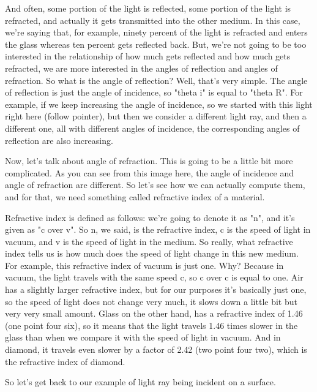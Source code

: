 And often, some portion of the light is reflected, some portion of the light is refracted, and actually it gets transmitted into the other medium. In this case, we're saying that, for example, ninety percent of the light is refracted and enters the glass whereas ten percent gets reflected back. But, we're not going to be too interested in the relationship of how much gets reflected and how much gets refracted, we are more interested in the angles of reflection and angles of refraction. So what is the angle of reflection? Well, that's very simple. The angle of reflection is just the angle of incidence, so "theta i" is equal to "theta R". For example, if we keep increasing the angle of incidence, so we started with this light right here (follow pointer), but then we consider a different light ray, and then a different one, all with different angles of incidence, the corresponding angles of reflection are also increasing.

Now, let's talk about angle of refraction. This is going to be a little bit more complicated. As you can see from this image here, the angle of incidence and angle of refraction are different. So let's see how we can actually compute them, and for that, we need something called refractive index of a material.

Refractive index is defined as follows: we're going to denote it as "n", and it's given as "c over v". So n, we said, is the refractive index, c is the speed of light in vacuum, and v is the speed of light in the medium. So really, what refractive index tells us is how much does the speed of light change in this new medium. For example, this refractive index of vacuum is just one. Why? Because in vacuum, the light travels with the same speed c, so c over c is equal to one. Air has a slightly larger refractive index, but for our purposes it's basically just one, so the speed of light does not change very much, it slows down a little bit but very very small amount. Glass on the other hand, has a refractive index of 1.46 (one point four six), so it means that the light travels 1.46 times slower in the glass than when we compare it with the speed of light in vacuum. And in diamond, it travels even slower by a factor of 2.42 (two point four two), which is the refractive index of diamond.

So let's get back to our example of light ray being incident on a surface.

